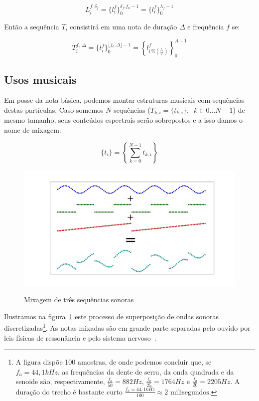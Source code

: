 \begin{equation}\label{periodoUnico}
L_i^{f , \delta_f } = \{ l_i^f \}_0^{\delta_f . f_a -1}=\{ l_i^f \}_0^{\lambda_f-1}
\end{equation}

Então a sequência $T_i$ consistirá em uma nota de duração $\Delta$ e frequência $f$ se:

\begin{equation}
T_i^{f,\; \Delta}=\{t_i^f\}_0^{\lfloor f_a . \Delta \rfloor -1}=\left \{ l^f_{i\,\%\left(\frac{f_a}{f}\right)} \right \}_0^{\Lambda-1}
\end{equation}


\subsection{Usos musicais}


Em posse da nota básica, podemos montar estruturas musicais com
sequências destas partículas. Caso somemos $N$ sequências ($T_{k,i}=\{t_{k,i}\}, \;\; k \in 0...N-1$) de mesmo tamanho, seus conteúdos espectrais serão sobrepostos e a isso damos o nome de mixagem:

\begin{equation}\label{eq:mixagem}
\{t_i\}=\left \{ \sum_{k=0}^{N-1}t_{k,i} \right \}
\end{equation}

\begin{figure}[h!]
    \centering
    \caption{Mixagem de três sequências sonoras}
        \includegraphics[width=\textwidth]{figuras/mixagem}
        \label{fig:mixagem}
\end{figure}


Ilustramos na figura~\ref{fig:mixagem} este processo de superposição de ondas sonoras discretizadas\footnote{A figura dispõe 100 amostras, de onde podemos concluir que, se $f_a=44,1kHz$, as frequências da dente de serra, da onda quadrada e da senoide são,
respectivamente, $\frac{f_a}{50}=882Hz$, $\frac{f_a}{25}=1764Hz$ e $\frac{f_a}{20}=2205Hz$. A duração do trecho é bastante curto $\frac{f_a=44,1kHz}{100} \approx 2 \text{ milisegundos}$.}.
 As notas mixadas são em grande parte separadas pelo ouvido por leis físicas de ressonância e pelo sistema nervoso~\cite{Roederer}.


